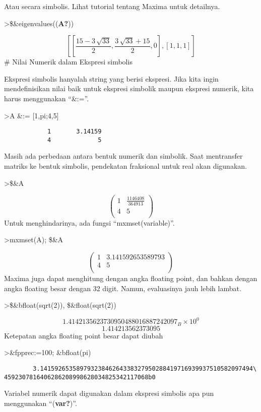 \documentclass[
]{book}
\begin{document}
Atau secara simbolis. Lihat tutorial tentang Maxima untuk detailnya.

\textgreater\$\&eigenvalues((\textbf{A?}))

\[\left[ \left[ \frac{15-3\,\sqrt{33}}{2} , \frac{3\,\sqrt{33}+15}{2}
  , 0 \right]  , \left[ 1 , 1 , 1 \right]  \right] \]\# Nilai Numerik dalam Ekspresi simbolis

Ekspresi simbolis hanyalah string yang berisi ekspresi. Jika kita ingin mendefinisikan nilai baik untuk ekspresi simbolik maupun ekspresi numerik, kita harus menggunakan ``\&:=''.

\textgreater A \&:= {[}1,pi;4,5{]}

\begin{verbatim}
            1       3.14159 
            4             5 
\end{verbatim}

Masih ada perbedaan antara bentuk numerik dan simbolik. Saat mentransfer matriks ke bentuk simbolis, pendekatan fraksional untuk real akan digunakan.

\textgreater\$\&A

\[\begin{pmatrix}1 & \frac{1146408}{364913} \\ 4 & 5 \\ \end{pmatrix}\]Untuk menghindarinya, ada fungsi ``mxmset(variable)''.

\textgreater mxmset(A); \$\&A

\[\begin{pmatrix}1 & 3.141592653589793 \\ 4 & 5 \\ \end{pmatrix}\]Maxima juga dapat menghitung dengan angka floating point, dan bahkan dengan angka floating besar dengan 32 digit. Namun, evaluasinya jauh lebih lambat.

\textgreater\$\&bfloat(sqrt(2)), \$\&float(sqrt(2))

\[1.4142135623730950488016887242097_B \times 10^{0}\]\[1.414213562373095\]Ketepatan angka floating point besar dapat diubah

\textgreater\&fpprec:=100; \&bfloat(pi)

\begin{verbatim}
        3.14159265358979323846264338327950288419716939937510582097494\
4592307816406286208998628034825342117068b0
\end{verbatim}

Variabel numerik dapat digunakan dalam ekspresi simbolis apa pun menggunakan ``(\textbf{var?})''.
\end{document}
